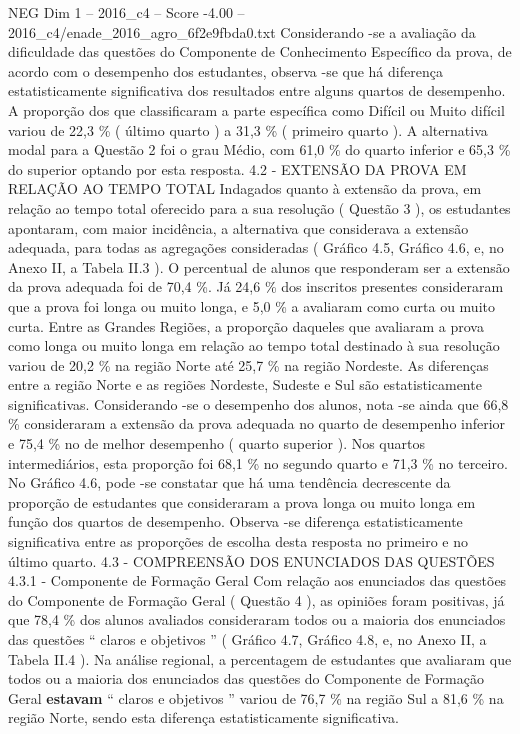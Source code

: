 \begin{textsample}{NEG Dim 1 – 2016\_c4 – Score -4.00 – 2016\_c4/enade\_2016\_agro\_6f2e9fbda0.txt}
Considerando -se a avaliação da dificuldade das questões do Componente de Conhecimento Específico da prova, de acordo com o desempenho dos estudantes, observa -se que há diferença estatisticamente significativa dos resultados entre alguns quartos de desempenho.
A proporção dos que classificaram a parte específica como Difícil ou Muito difícil variou de 22,3 \% ( último quarto ) a 31,3 \% ( primeiro quarto ).
A alternativa modal para a Questão 2 foi o grau Médio, com 61,0 \% do quarto inferior e 65,3 \% do superior optando por esta resposta. 4.2 - EXTENSÃO DA PROVA EM RELAÇÃO AO TEMPO TOTAL Indagados quanto à extensão da prova, em relação ao tempo total oferecido para a sua resolução ( Questão 3 ), os estudantes apontaram, com maior incidência, a alternativa que considerava a extensão adequada, para todas as agregações consideradas ( Gráfico 4.5, Gráfico 4.6, e, no Anexo II, a Tabela II.3 ).
O percentual de alunos que responderam ser a extensão da prova adequada foi de 70,4 \%.
Já 24,6 \% dos inscritos presentes consideraram que a prova foi longa ou muito longa, e 5,0 \% a avaliaram como curta ou muito curta.
Entre as Grandes Regiões, a proporção daqueles que avaliaram a prova como longa ou muito longa em relação ao tempo total destinado à sua resolução variou de 20,2 \% na região Norte até 25,7 \% na região Nordeste.
As diferenças entre a região Norte e as regiões Nordeste, Sudeste e Sul são estatisticamente significativas.
Considerando -se o desempenho dos alunos, nota -se ainda que 66,8 \% consideraram a extensão da prova adequada no quarto de desempenho inferior e 75,4 \% no de melhor desempenho ( quarto superior ).
Nos quartos intermediários, esta proporção foi 68,1 \% no segundo quarto e 71,3 \% no terceiro.
No Gráfico 4.6, pode -se constatar que há uma tendência decrescente da proporção de estudantes que consideraram a prova longa ou muito longa em função dos quartos de desempenho.
Observa -se diferença estatisticamente significativa entre as proporções de escolha desta resposta no primeiro e no último quarto. 4.3 - COMPREENSÃO DOS ENUNCIADOS DAS QUESTÕES 4.3.1 - Componente de Formação Geral Com relação aos enunciados das questões do Componente de Formação Geral ( Questão 4 ), as opiniões foram positivas, já que 78,4 \% dos alunos avaliados consideraram todos ou a maioria dos enunciados das questões “ claros e objetivos ” ( Gráfico 4.7, Gráfico 4.8, e, no Anexo II, a Tabela II.4 ).
Na análise regional, a percentagem de estudantes que avaliaram que todos ou a maioria dos enunciados das questões do Componente de Formação Geral \textbf{estavam} “ claros e objetivos ” variou de 76,7 \% na região Sul a 81,6 \% na região Norte, sendo esta diferença estatisticamente significativa.

\end{textsample}
